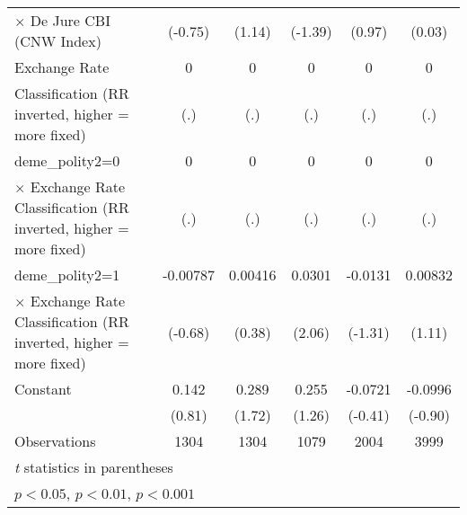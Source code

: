{\begin{tabular}{l*{5}{c}}
$\times$ De Jure CBI (CNW Index)&  (-0.75)         &   (1.14)         &  (-1.39)         &   (0.97)         &   (0.03)         \\
\addlinespace
Exchange Rate   &        0         &        0         &        0         &        0         &        0         \\
Classification (RR inverted, higher = more fixed)&      (.)         &      (.)         &      (.)         &      (.)         &      (.)         \\
\addlinespace
deme\_polity2=0  &        0         &        0         &        0         &        0         &        0         \\
$\times$ Exchange Rate Classification (RR inverted, higher = more fixed)&      (.)         &      (.)         &      (.)         &      (.)         &      (.)         \\
\addlinespace
deme\_polity2=1  & -0.00787         &  0.00416         &   0.0301\sym{*}  &  -0.0131         &  0.00832         \\
$\times$ Exchange Rate Classification (RR inverted, higher = more fixed)&  (-0.68)         &   (0.38)         &   (2.06)         &  (-1.31)         &   (1.11)         \\
\addlinespace
Constant        &    0.142         &    0.289         &    0.255         &  -0.0721         &  -0.0996         \\
                &   (0.81)         &   (1.72)         &   (1.26)         &  (-0.41)         &  (-0.90)         \\
\midrule
Observations    &     1304         &     1304         &     1079         &     2004         &     3999         \\
\bottomrule
\multicolumn{6}{l}{\footnotesize \textit{t} statistics in parentheses}\\
\multicolumn{6}{l}{\footnotesize \sym{*} \(p<0.05\), \sym{**} \(p<0.01\), \sym{***} \(p<0.001\)}\\
\end{tabular}
}
